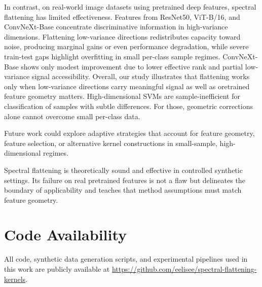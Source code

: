 \documentclass{article}
\begin{document}
In contrast, on real-world image datasets using pretrained deep features, spectral flattening has limited effectiveness. Features from ResNet50, ViT-B/16, and ConvNeXt-Base concentrate discriminative information in high-variance dimensions. Flattening low-variance directions redistributes capacity toward noise, producing marginal gains or even performance degradation, while severe train-test gaps highlight overfitting in small per-class sample regimes. ConvNeXt-Base shows only modest improvement due to lower effective rank and partial low-variance signal accessibility.  
Overall, our study illustrates that flattening works only when low-variance directions carry meaningful signal as well as oretrained feature geometry matters. High-dimensional SVMs are sample-inefficient for classification of samples with subtle differences. For those, geometric corrections alone cannot overcome small per-class data. 

Future work could explore adaptive strategies that account for feature geometry, feature selection, or alternative kernel constructions in small-sample, high-dimensional regimes. 

Spectral flattening is theoretically sound and effective in controlled synthetic settings. Its failure on real pretrained features is not a flaw but delineates the boundary of applicability and teaches that method assumptions must match feature geometry.

\section*{Code Availability}

All code, synthetic data generation scripts, and experimental pipelines used in this work are publicly available at
\url{https://github.com/eelisee/spectral-flattening-kernels}.



\end{document}
